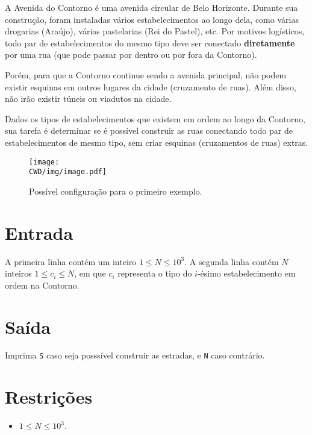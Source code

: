 %

A Avenida do Contorno é uma avenida circular de Belo Horizonte. Durante sua construção, foram instaladas vários estabelecimentos ao longo dela, como várias drogarias (Araújo), várias pastelarias (Rei do Pastel), etc. Por motivos logísticos, todo par de estabelecimentos do mesmo tipo deve ser conectado \textbf{diretamente} por uma rua (que pode passar por dentro ou por fora da Contorno).

Porém, para que a Contorno continue sendo a avenida principal, não podem existir esquinas em outros lugares da cidade (cruzamento de ruas). Além disso, não irão existir túneis ou viadutos na cidade.

Dados os tipos de estabelecimentos que existem em ordem ao longo da Contorno, sua tarefa é determinar se é possível construir as ruas conectando todo par de estabelecimentos de mesmo tipo, sem criar esquinas (cruzamentos de ruas) extras.

\begin{figure}[H]
  \centering
  \texttt{[image: \\CWD/img/image.pdf]}
  \caption{Possível configuração para o primeiro exemplo.}
\end{figure}

%
%

\section*{Entrada}

A primeira linha contém um inteiro $1 \leq N \leq 10^3$. A segunda linha contém $N$ inteiros $1 \leq c_i \leq N$, em que $c_i$ representa o tipo do $i$-ésimo estabelecimento em ordem na Contorno.

%
%

\section*{Saída}

Imprima {\tt S} caso seja posssível construir as estradas, e {\tt N} caso contrário.

\section*{Restrições}

\begin{itemize}
\item $1 \leq N \leq 10^3$.
\end{itemize}


\exemplo
